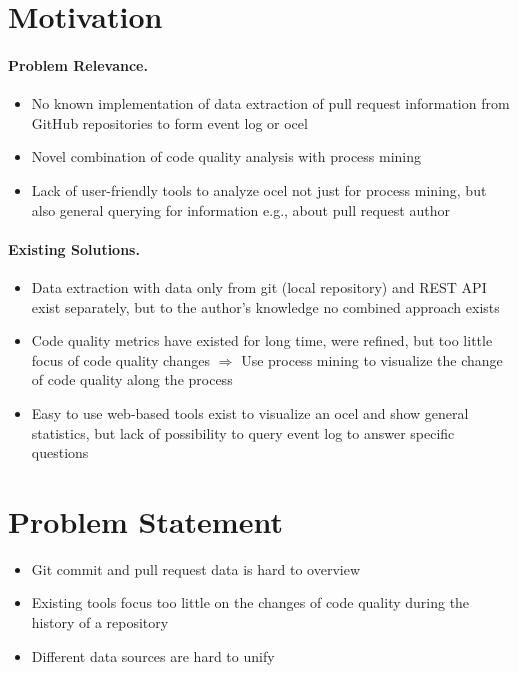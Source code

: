 \section{Motivation}
\label{sec:intro_ssec:motiv}
\paragraph{Problem Relevance.} 
\begin{itemize}
	\item No known implementation of data extraction of pull request information from GitHub repositories to form event log or \ac{ocel}
	\item Novel combination of code quality analysis with process mining
	\item Lack of user-friendly tools to analyze \ac{ocel} not just for process mining, but also general querying for information e.g., about pull request author
\end{itemize}

\paragraph{Existing Solutions.}
\begin{itemize}
	\item Data extraction with data only from git (local repository) and REST API exist separately, but to the author's knowledge no combined approach exists
	\item Code quality metrics have existed for long time, were refined, but too little focus of code quality changes $\Rightarrow$ Use process mining to visualize the change of code quality along the process
	\item Easy to use web-based tools exist to visualize an \ac{ocel} and show general statistics, but lack of possibility to query event log to answer specific questions
\end{itemize}


\section{Problem Statement}
\label{sec:intro_ssec:probs}
\begin{itemize}
	\item Git commit and pull request data is hard to overview
	\item Existing tools focus too little on the changes of code quality during the history of a repository
	\item Different data sources are hard to unify
\end{itemize}


